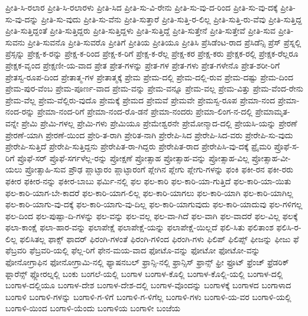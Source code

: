 {ಪ್ರೀತಿ-ಸಿ-ರಲಾರ
ಪ್ರೀತಿ-ಸಿ-ರಲಾರಳು
ಪ್ರೀತಿ-ಸಿದ
ಪ್ರೀತಿ-ಸು-ವಿ-ರೇನು
ಪ್ರೀತಿ-ಸು-ವು-ದ-ರಿಂದ
ಪ್ರೀತಿ-ಸು-ವು-ದಕ್ಕೆ
ಪ್ರೀತಿ-ಸು-ವು-ದನ್ನು
ಪ್ರೀತಿ-ಸು-ವುದು
ಪ್ರೀತಿ-ಸು-ವೆನು
ಪ್ರೀತಿ-ಸುತ್ತಾರೆ
ಪ್ರೀತಿ-ಸುತ್ತಿ-ರ-ಲಿಲ್ಲ
ಪ್ರೀತಿ-ಸುತ್ತಿ-ರು-ವೆವು
ಪ್ರೀತಿ-ಸುತ್ತಿದ್ದ
ಪ್ರೀತಿ-ಸುತ್ತಿದ್ದಂತೆ
ಪ್ರೀತಿ-ಸುತ್ತಿದ್ದರು
ಪ್ರೀತಿ-ಸುತ್ತಿದ್ದಳು
ಪ್ರೀತಿ-ಸುತ್ತಿದ್ದೆ
ಪ್ರೀತಿ-ಸುತ್ತೇನೆ
ಪ್ರೀತಿ-ಸುತ್ತೇವೆ
ಪ್ರೀತಿ-ಸುವ
ಪ್ರೀತಿ-ಸುವನು
ಪ್ರೀತಿ-ಸುವನೊ
ಪ್ರೀತಿ-ಸುವರೊ
ಪ್ರೀತಿಗೆ
ಪ್ರೀತಿಯ
ಪ್ರೀತಿಯೂ
ಪ್ರೀತಿಸಿ
ಪ್ರೆಸಿಡೆಂಟ-ರಾದ
ಪ್ರೆಸಿಡೆನ್ಸಿ
ಪ್ರೆಸ್
ಪ್ರೆಸ್ನಲ್ಲಿ
ಪ್ರೆಸ್ಸನ್ನು
ಪ್ರೇಕ್ಷ-ಕ-ರನ್ನು
ಪ್ರೇಕ್ಷ-ಕ-ರಿಂದ
ಪ್ರೇಕ್ಷ-ಕ-ರಿಗೆ
ಪ್ರೇಕ್ಷ-ಕ-ರೆಲ್ಲ
ಪ್ರೇಕ್ಷ-ಕರ
ಪ್ರೇಕ್ಷ-ಕರು
ಪ್ರೇಕ್ಷಕ-ರಲ್ಲಿ
ಪ್ರೇಕ್ಷಕ-ರೆಲ್ಲರೂ
ಪ್ರೇಕ್ಷಕ-ವೃಂದ
ಪ್ರೇಕ್ಷಣೀ-ಯ-ವಾದ
ಪ್ರೇತ
ಪ್ರೇತ-ಗಳನ್ನು
ಪ್ರೇತ-ಗಳ
ಪ್ರೇತ-ಗಳು
ಪ್ರೇತ-ಗಳೇನೊ
ಪ್ರೇತ-ಶರೀ-ರಿಗೆ
ಪ್ರೇತಸ್ವ-ರೂಪ-ದಿಂದ
ಪ್ರೇತಾತ್ಮ-ಗಳ
ಪ್ರೇತಾತ್ಮಕ್ಕೆ
ಪ್ರೇಮ
ಪ್ರೇಮ-ದಲ್ಲಿ
ಪ್ರೇಮ-ದಲ್ಲಿ-ರುವ
ಪ್ರೇಮ-ದಷ್ಟು
ಪ್ರೇಮ-ದಿಂದ
ಪ್ರೇಮ-ಪುರ-ವೆಂಬ
ಪ್ರೇಮ-ಪೂರ್ಣ-ವಾದ
ಪ್ರೇಮ-ವನ್ನು
ಪ್ರೇಮ-ವನ್ನೂ
ಪ್ರೇಮ-ವಲ್ಲ
ಪ್ರೇಮ-ವಿತ್ತು
ಪ್ರೇಮ-ವೆಂದ-ರೇನು
ಪ್ರೇಮ-ವೆಲ್ಲ
ಪ್ರೇಮ-ವೆಲ್ಲಿರು-ವುದೊ
ಪ್ರೇಮಕ್ಕೆ
ಪ್ರೇಮದ
ಪ್ರೇಮವೆ
ಪ್ರೇಮವೇ
ಪ್ರೇಮಸ್ವ-ರೂಪ
ಪ್ರೇಮಾ-ನಂದ
ಪ್ರೇಮಾ-ನಂದ-ರನ್ನು
ಪ್ರೇಮಾ-ನಂದ-ರಿಗೆ
ಪ್ರೇಮಾ-ನಂದ-ರೊ-ಡನೆ
ಪ್ರೇಮಾ-ನಂದರು
ಪ್ರೇಮಾ-ಲಿಂಗ-ನ-ದಲ್ಲಿ
ಪ್ರೇಮಾಮೃತ-ವನ್ನೇ
ಪ್ರೇಮಿ
ಪ್ರೇಮಿ-ಗಳಲ್ಲ
ಪ್ರೇಮಿ-ಗಳು
ಪ್ರೇಮಿಯೂ
ಪ್ರೇಮೇಶ್ವರನೇ
ಪ್ರೇಮೋನ್ಮಾದ-ದಲ್ಲಿ
ಪ್ರೇಯಸಿ-ಯನ್ನು
ಪ್ರೇರಣೆ
ಪ್ರೇರಣೆ-ಯಾಗಿ
ಪ್ರೇರಣೆ-ಯಿಂದ
ಪ್ರೇರಿ-ತ-ರಾಗಿ
ಪ್ರೇರಿತ-ನಾಗಿ
ಪ್ರೇರೇಪಿ-ಸಿದ
ಪ್ರೇರೇಪಿ-ಸಿದ-ವರು
ಪ್ರೇರೇಪಿ-ಸು-ವುದು
ಪ್ರೇರೇಪಿ-ಸುತ್ತಿದೆ
ಪ್ರೇರೇಪಿ-ಸುತ್ತಿದ್ದನು
ಪ್ರೇರೇಪಿತ-ರಾ-ಗಿದ್ದರು
ಪ್ರೇರೇಪಿತ-ರಾದ
ಪ್ರೇರೇಪಿಸಿ-ವು-ದಕ್ಕೆ
ಪ್ರೈಮರಿ
ಪ್ರೊಫೆ-ಸ-ರಿಗೆ
ಪ್ರೊಫೆ-ಸರ್
ಪ್ರೊಫೆ-ಸರ್ಗಳೆಲ್ಲ-ರನ್ನು
ಪ್ರೋಕ್ಷಣೆ
ಪ್ರೋತ್ಸಾಹ
ಪ್ರೋತ್ಸಾಹ-ವನ್ನು
ಪ್ರೋತ್ಸಾಹ-ವಿಲ್ಲ
ಪ್ರೋತ್ಸಾಹ-ವೀ-ಯಲು
ಪ್ರೋತ್ಸಾಹಿ-ಸುವ
ಪ್ರೌಢ
ಪ್ಲಾಟ್ಫಾರಂ
ಪ್ಲಾಟ್ಫಾರಂಗೆ
ಪ್ಲೇಗಿನ
ಪ್ಲೇಗು
ಪ್ಲೇಗು-ಗಳನ್ನು
ಫಂಕಿ
ಫಕೀ-ರನ
ಫಕೀ-ರರು
ಫಕೀರ
ಫಕೀರ-ನನ್ನು
ಫಕೀರ-ಬಾಬು
ಫರ್ಮಿ-ನಲ್ಲಿ
ಫಲ
ಫಲ-ಕಾರಿ
ಫಲ-ಕಾರಿ-ಯಾ-ಗುತ್ತಿದೆ
ಫಲ-ಕಾರಿ-ಯಾ-ಯಿತು
ಫಲ-ಕಾರಿ-ಯಾಗ-ಬೇ-ಕಾದರೆ
ಫಲ-ಕಾರಿ-ಯಾಗ-ಲಿಲ್ಲ
ಫಲ-ಕಾರಿ-ಯಾಗಲು
ಫಲ-ಕಾರಿ-ಯಾಗಿ
ಫಲ-ಕಾರಿ-ಯಾಗಿಲ್ಲ
ಫಲ-ಕಾರಿ-ಯಾಗು-ವು-ದಕ್ಕೆ
ಫಲ-ಕಾರಿ-ಯಾಗು-ವು-ದಿಲ್ಲ
ಫಲ-ಕಾರಿ-ಯಾಗುವುದು
ಫಲ-ಕಾರಿ-ಯಾದುವು
ಫಲ-ಗಳಿಗಲ್ಲ
ಫಲ-ದಿಂದ
ಫಲ-ಪುಷ್ಪಾ-ದಿ-ಗಳನ್ನು
ಫಲ-ವನ್ನು
ಫಲ-ವಲ್ಲ
ಫಲ-ವಾ-ಗಿದೆ
ಫಲ-ವಾಗಿ
ಫಲ-ವಾದರೆ
ಫಲ-ವಿಲ್ಲ
ಫಲಕ್ಕೆ
ಫಲಾ-ಕಾಂಕ್ಷೆ
ಫಲಾ-ಹಾರ-ವನ್ನು
ಫಲಾಪೇಕ್ಷೆ
ಫಲಾಪೇಕ್ಷೆ-ಯನ್ನು
ಫಲಾಪೇಕ್ಷೆ-ಯಿಲ್ಲದೆ
ಫಲಿ-ಸಿತು
ಫಲಿತಾಂಶ
ಫಲಿಸಿ-ರ-ಲಿಲ್ಲ
ಫಲಿಸಿತಲ್ಲ
ಫಾಕ್ಸ್
ಫಾದರ್
ಫಿರಂಗಿ-ಗಳಂತೆ
ಫಿರಂಗಿ-ಗಳಿಂದ
ಫಿರಂಗಿ-ಗಳು
ಫಿಲಿಪ್
ಫಿಲಿಪ್ಸ್
ಫೀಜನ್ನು
ಫೀಜು
ಫೆ
ಫೆಬ್ರವರಿ
ಫೆಬ್ರವರಿ-ಯಲ್ಲಿ
ಫೆಲ್ಲ-ರಿಗೆ
ಫೇನ-ಮಯ-ವಾದ
ಫೋಟೊ-ವನ್ನು
ಫೋಟೋ
ಫೋಟೋ-ವನ್ನು
ಫೋನೋಗ್ರಾಫಿನ
ಫೋನೋಗ್ರಾಮಿ-ನಲ್ಲಿ
ಫ್ಯಾಷನಬಲ್
ಫ್ರಾನ್ಸಿ-ನಲ್ಲಿ
ಫ್ರಾನ್ಸಿಸ್
ಫ್ರಾನ್ಸ್
ಫ್ರೀ
ಫ್ರೂಟ್
ಫ್ರೆಂಚ್
ಫ್ರೆಡರಿಕ್
ಫ್ಲಾರೆನ್ಸ್
ಫ್ಲೋರಲ್ನಲ್ಲಿ
ಬಂಕು
ಬಂಗಲೆ-ಯಲ್ಲಿ
ಬಂಗಾಳ
ಬಂಗಾಳ-ಕೊಲ್ಲಿ
ಬಂಗಾಳ-ಕೊಲ್ಲಿ-ಯಲ್ಲಿ
ಬಂಗಾಳ-ದಲ್ಲಿ
ಬಂಗಾಳ-ದಲ್ಲಿಯೂ
ಬಂಗಾಳ-ದೇಶ
ಬಂಗಾಳ-ದೇಶ-ದಲ್ಲಿ
ಬಂಗಾಳ-ವೊಂದನ್ನು
ಬಂಗಾಳಕ್ಕೆ
ಬಂಗಾಳದ
ಬಂಗಾಳಾದ
ಬಂಗಾಳಿ
ಬಂಗಾಳಿ-ಗಳನ್ನು
ಬಂಗಾಳಿ-ಗ-ಳಿಗೆ
ಬಂಗಾಳಿ-ಗ-ಳಿಗೆಲ್ಲ
ಬಂಗಾಳಿ-ಗಳು
ಬಂಗಾಳಿ-ಯ-ವರ
ಬಂಗಾಳಿ-ಯಲ್ಲಿ
ಬಂಗಾಳಿ-ಯಿಂದ
ಬಂಗಾಳಿ-ಯೆಂದು
ಬಂಗಾಳಿಯ
ಬಂಗಾಳೀ
ಬಂಜೆಯ
}
